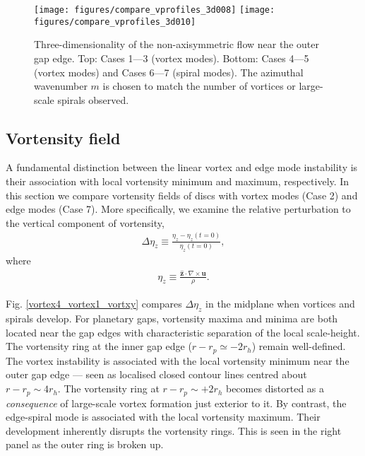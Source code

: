 %

%

\begin{figure}
  \centering
  \texttt{[image: figures/compare\_vprofiles\_3d008]}  
  \texttt{[image: figures/compare\_vprofiles\_3d010]}  
  \caption{Three-dimensionality of the non-axisymmetric
    flow near the outer gap edge. Top: Cases 1---3 (vortex modes). 
    Bottom: Cases 4---5 (vortex modes) and Cases 6---7 (spiral
    modes). The azimuthal wavenumber $m$ is chosen to match the number
    of vortices or large-scale spirals observed. 
    \label{compare_vprofiles_3d008}}
\end{figure}

\subsection{Vortensity field}\label{vortensity}
A fundamental distinction between the linear vortex and edge mode
instability is their association with local vortensity minimum and
maximum, respectively. In this section we compare vortensity fields of 
discs with vortex modes (Case 2) and edge modes (Case 7). 
More specifically, we examine the relative
perturbation to the vertical component of vortensity,  
\begin{align}
  \Delta\eta_z\equiv \frac{\eta_z - \eta_z(t=0)}{\eta_z(t=0)},
\end{align}
where
\begin{align}
  \eta_z \equiv \frac{\bm{\hat{z}}\cdot\nabla\times\bm{u}}{\rho}. 
\end{align}

Fig. \ref{vortex4_vortex1_vortxy} compares $\Delta\eta_z$ in the
midplane when vortices and spirals develop. For planetary gaps, 
vortensity maxima and minima are both located near the gap edges with 
characteristic separation of the local scale-height. The vortensity
ring at the inner gap edge ($r-r_p\simeq - 2r_h$) remain
well-defined. The vortex instability is associated with the local
vortensity minimum near the outer gap edge --- seen as localised closed
contour lines centred about $r - r_p \sim 4r_h$. The vortensity ring at
$r-r_p\sim +2r_h$ becomes distorted as a \emph{consequence} of
large-scale vortex formation just exterior to it. By contrast, the
edge-spiral mode is associated with the local vortensity
maximum. Their development inherently disrupts the vortensity
rings. This is seen in the right panel as the outer ring is broken up.    
    
